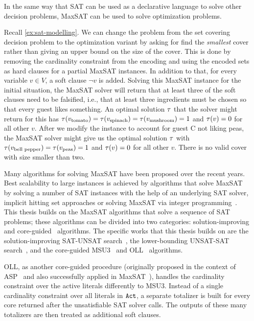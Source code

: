 In the same way that SAT can be used as a declarative language to solve other decision problems, MaxSAT can be used to solve optimization problems.

\begin{example}\label{ex:maxsat-modelling}
  Recall \cref{ex:sat-modelling}.
  We can change the problem from the set covering decision problem to the optimization variant by asking for find the \emph{smallest} cover rather than giving an upper bound on the size of the cover.
  This is done by removing the cardinality constraint from the encoding and using the encoded sets as hard clauses for a partial MaxSAT instances.
  In addition to that, for every variable $v\in V$, a soft clause $\lnot v$ is added.
  Solving this MaxSAT instance for the initial situation, the MaxSAT solver will return that at least three of the soft clauses need to be falsified, i.e., that at least three ingredients must be chosen so that every guest likes something.
  An optimal solution $\tau$ that the solver might return for this has $\tau(v_\text{tomato}) = \tau(v_\text{spinach}) = \tau(v_\text{mushroom}) = 1$ and $\tau(v) = 0$ for all other $v$.
  After we modify the instance to account for guest C not liking peas, the MaxSAT solver might give us the optimal solution $\tau$ with $\tau(v_\text{bell pepper}) = \tau(v_\text{peas}) = 1$ and $\tau(v) = 0$ for all other $v$.
  There is no valid cover with size smaller than two.
\end{example}

Many algorithms for solving MaxSAT have been proposed over the recent years.
Best scalability to large instances is achieved by algorithms that solve MaxSAT by solving a number of SAT instances with the help of an underlying SAT solver, implicit hitting set approaches or solving MaxSAT via integer programming~\autocite{handbook2-maxsat}.
This thesis builds on the MaxSAT algorithms that solve a sequence of SAT problems;
these algorithms can be divided into two categories: solution-improving and core-guided~\autocite{DBLP:conf/sat/FuM06} algorithms.
The specific works that this thesis builds on are the solution-improving SAT-UNSAT search~\autocite{DBLP:journals/jsat/BerreP10}, the lower-bounding UNSAT-SAT search~\autocite{}, and the core-guided MSU3~\autocite{DBLP:journals/corr/abs-0712-1097} and OLL~\autocite{DBLP:conf/cp/MorgadoDM14} algorithms.

OLL, as another core-guided procedure (originally proposed in the context of ASP~\autocite{DBLP:conf/iclp/AndresKMS12} and also successfully applied in MaxSAT~\autocites{DBLP:conf/cp/MorgadoDM14,DBLP:journals/jsat/IgnatievMM19}), handles the cardinality constraint over the active literals differently to MSU3.
Instead of a single cardinality constraint over all literals in $\texttt{Act}$, a separate totalizer is built for every core returned after the unsatisfiable SAT solver calls.
The outputs of these many totalizers are then treated as additional soft clauses.

